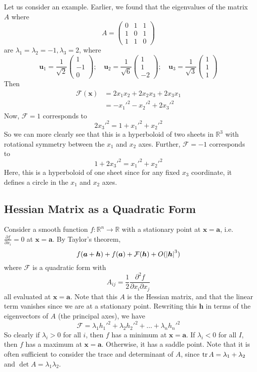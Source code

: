 \documentclass{article}
\begin{document}
Let us consider an example. Earlier, we found that the eigenvalues of the matrix $A$ where
\[ A = \begin{pmatrix}
		0 & 1 & 1 \\ 1 & 0 & 1 \\ 1 & 1 & 0
	\end{pmatrix} \]
are $\lambda_1 = \lambda_2 = -1, \lambda_3 = 2$, where
\[ \bm u_1 = \frac{1}{\sqrt 2} \begin{pmatrix}
		1 \\ -1 \\ 0
	\end{pmatrix};\quad \bm u_2 = \frac{1}{\sqrt 6}\begin{pmatrix}
		1 \\ 1 \\ -2
	\end{pmatrix};\quad \bm u_3 = \frac{1}{\sqrt 3}\begin{pmatrix}
		1 \\ 1 \\ 1
	\end{pmatrix} \]
Then
\begin{align*}
	\mathcal F(\bm x) & = 2x_1x_2 + 2x_2x_3 + 2x_3x_1 \\
	                  & = -x_1'^2 -x_2'^2 + 2x_3'^2
\end{align*}
Now, $\mathcal F = 1$ corresponds to
\[ 2x_3'^2 = 1 + x_1'^2 + x_2'^2 \]
So we can more clearly see that this is a hyperboloid of two sheets in $\mathbb R^3$ with rotational symmetry between the $x_1$ and $x_2$ axes. Further, $\mathcal F = -1$ corresponds to
\[ 1 + 2x_3'^2 = x_1'^2 + x_2'^2 \]
Here, this is a hyperboloid of one sheet since for any fixed $x_3$ coordinate, it defines a circle in the $x_1$ and $x_2$ axes.

\subsection{Hessian Matrix as a Quadratic Form}
Consider a smooth function $f\colon \mathbb R^n \to \mathbb R$ with a stationary point at $\bm x = \bm a$, i.e. $\frac{\partial f}{\partial x_i} = 0$ at $\bm x = \bm a$. By Taylor's theorem,
\[ f(\bm a + \bm h) + f(\bm a) + \mathcal F(\bm h) + O(\abs{\bm h}^3) \]
where $\mathcal F$ is a quadratic form with
\[ A_{ij} = \frac{1}{2}\frac{\partial^2 f}{\partial x_i\partial x_j} \]
all evaluated at $\bm x = \bm a$. Note that this $A$ is the Hessian matrix, and that the linear term vanishes since we are at a stationary point. Rewriting this $\bm h$ in terms of the eigenvectors of $A$ (the principal axes), we have
\[ \mathcal F = \lambda_1 h_1'^2 + \lambda_2 h_2'^2 + \dots + \lambda_n h_n'^2 \]
So clearly if $\lambda_i > 0$ for all $i$, then $f$ has a minimum at $\bm x = \bm a$. If $\lambda_i < 0$ for all $I$, then $f$ has a maximum at $\bm x = \bm a$. Otherwise, it has a saddle point. Note that it is often sufficient to consider the trace and determinant of $A$, since $\trace A = \lambda_1 + \lambda_2$ and $\det A = \lambda_1\lambda_2$.
\end{document}
